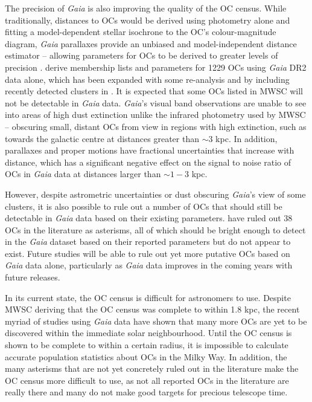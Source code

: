 The precision of \emph{Gaia} is also improving the quality of the OC census. While traditionally, distances to OCs would be derived using photometry alone and fitting a model-dependent stellar isochrone to the OC's colour-magnitude diagram, \emph{Gaia} parallaxes provide an unbiased and model-independent distance estimator -- allowing parameters for OCs to be derived to greater levels of precision . \cite{cantat-gaudin_gaia_2018} derive membership lists and parameters for 1229 OCs using \emph{Gaia} DR2 data alone, which has been expanded with some re-analysis and by including recently detected clusters in \cite{cantat-gaudin_clusters_2020}. It is expected that some OCs listed in MWSC will not be detectable in \emph{Gaia} data. \emph{Gaia}'s visual band observations are unable to see into areas of high dust extinction unlike the infrared photometry used by MWSC -- obscuring small, distant OCs from view in regions with high extinction, such as towards the galactic centre at distances greater than $\sim3$ kpc. In addition, parallaxes and proper motions have fractional uncertainties that increase with distance, which has a significant negative effect on the signal to noise ratio of OCs in \emph{Gaia} data at distances larger than $\sim1-3$ kpc.

However, despite astrometric uncertainties or dust obscuring \emph{Gaia}'s view of some clusters, it is also possible to rule out a number of OCs that should still be detectable in \emph{Gaia} data based on their existing parameters. \cite{cantat-gaudin_clusters_2020} have ruled out 38 OCs in the literature as asterisms, all of which should be bright enough to detect in the \emph{Gaia} dataset based on their reported parameters but do not appear to exist. Future studies will be able to rule out yet more putative OCs based on \emph{Gaia} data alone, particularly as \emph{Gaia} data improves in the coming years with future releases.

In its current state, the OC census is difficult for astronomers to use. Despite MWSC deriving that the OC census was complete to within 1.8 kpc, the recent myriad of studies using \emph{Gaia} data have shown that many more OCs are yet to be discovered within the immediate solar neighbourhood. Until the OC census is shown to be complete to within a certain radius, it is impossible to calculate accurate population statistics about OCs in the Milky Way. In addition, the many asterisms that are not yet concretely ruled out in the literature make the OC census more difficult to use, as not all reported OCs in the literature are really there and many do not make good targets for precious telescope time.

